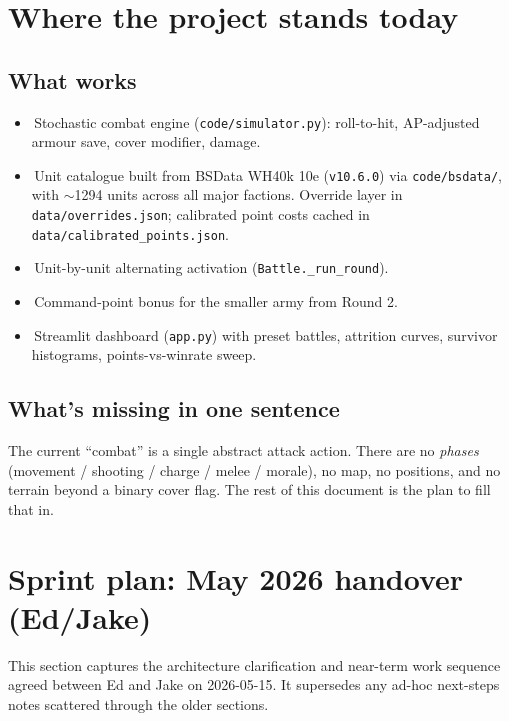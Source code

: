 \documentclass[11pt,a4paper]{article}
\newcommand{\done}{\ding{51}\,}     %
\begin{document}
\section{Where the project stands today}

\subsection{What works}
\begin{itemize}[itemsep=2pt]
  \item \done Stochastic combat engine (\texttt{code/simulator.py}):
    roll-to-hit, AP-adjusted armour save, cover modifier, damage.
  \item \done Unit catalogue built from BSData WH40k 10e
    (\texttt{v10.6.0}) via \texttt{code/bsdata/}, with $\sim$1294 units
    across all major factions. Override layer in
    \texttt{data/overrides.json}; calibrated point costs cached in
    \texttt{data/calibrated\_points.json}.
  \item \done Unit-by-unit alternating activation
    (\texttt{Battle.\_run\_round}).
  \item \done Command-point bonus for the smaller army from Round 2.
  \item \done Streamlit dashboard (\texttt{app.py}) with preset battles,
    attrition curves, survivor histograms, points-vs-winrate sweep.
\end{itemize}

\subsection{What's missing in one sentence}

The current ``combat'' is a single abstract attack action. There are no
\emph{phases} (movement / shooting / charge / melee / morale), no map,
no positions, and no terrain beyond a binary cover flag. The rest of
this document is the plan to fill that in.

\section{Sprint plan: May 2026 handover (Ed/Jake)}
\label{sec:sprint-may-2026}

This section captures the architecture clarification and near-term work
sequence agreed between Ed and Jake on 2026-05-15. It supersedes any
ad-hoc next-steps notes scattered through the older sections.
\end{document}
